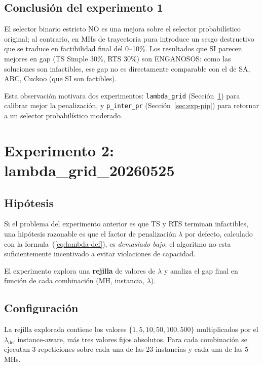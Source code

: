 \documentclass[11pt,a4paper]{article}
\theoremstyle{definition}
\theoremstyle{remark}
\begin{document}
\subsection{Conclusión del experimento 1}

El selector binario estricto NO es una mejora sobre el selector
probabilístico original; al contrario, en MHs de trayectoria pura
introduce un sesgo destructivo que se traduce en factibilidad final
del 0--10\%. Los resultados que SI parecen mejores en gap (TS Simple
30\%, RTS 30\%) son ENGANOSOS: como las soluciones son infactibles,
ese gap no es directamente comparable con el de SA, ABC, Cuckoo (que
SI son factibles).

Esta observación motivara dos experimentos: \texttt{lambda\_grid}
(Sección~\ref{sec:exp-lambda}) para calibrar mejor la penalización, y
\texttt{p\_inter\_pr} (Sección~\ref{sec:exp-pip}) para retornar a un
selector probabilístico moderado.

\section{Experimento 2: lambda\_grid\_20260525}
\label{sec:exp-lambda}

\subsection{Hipótesis}

Si el problema del experimento anterior es que TS y RTS terminan
infactibles, una hipótesis razonable es que el factor de penalización
$\lambda$ por defecto, calculado con la formula~(\ref{eq:lambda-def}),
es \emph{demasiado bajo}: el algoritmo no esta suficientemente
incentivado a evitar violaciones de capacidad.

El experimento explora una \textbf{rejilla} de valores de $\lambda$ y
analiza el gap final en función de cada combinación (MH, instancia,
$\lambda$).

\subsection{Configuración}

La rejilla explorada contiene los valores
$\{1, 5, 10, 50, 100, 500\}$ multiplicados por el $\lambda_{\text{def}}$
instance-aware, más tres valores fijos absolutos. Para cada
combinación se ejecutan 3 repeticiones sobre cada una de las 23
instancias y cada una de las 5 MHs.
\end{document}
